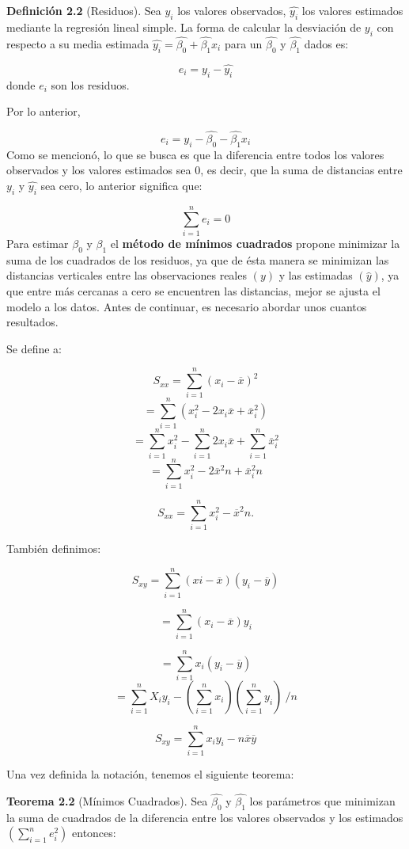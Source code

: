 \documentclass[
  a4paper,
  oneside,
  openany]{book}
\begin{document}
\textbf{Definición 2.2} (Residuos). Sea \(y_{i}\) los valores observados, \(\hat{y_{i}}\) los valores estimados mediante la regresión lineal simple. La forma de calcular la desviación de \(y_{i}\) con respecto a su media estimada \(\hat{y_{i}}=\hat{\beta_{0}}+\hat{\beta_{1}}x_{i}\) para un \(\hat{\beta_{0}}\) y \(\hat{\beta_{1}}\) dados es:

\[e_{i}=y_{i}-\hat{y_{i}}\]
donde \(e_{i}\) son los residuos.

Por lo anterior,

\[e_{i}=y_{i}-\hat{\beta_{0}}-\hat{\beta_{1}}x_{i}\]
Como se mencionó, lo que se busca es que la diferencia entre todos los valores observados y los valores estimados sea 0, es decir, que la suma de distancias entre \(y_{i}\) y \(\hat{y_{i}}\) sea cero, lo anterior significa que:

\[\sum_{i=1}^{n}e_{i}=0\]
Para estimar \(\beta_{0}\) y \(\beta_{1}\) el \textbf{método de mínimos cuadrados} propone minimizar la suma de los cuadrados de los residuos, ya que de ésta manera se minimizan las distancias verticales entre las observaciones reales \((y)\) y las estimadas \((\hat{y})\), ya que entre más cercanas a cero se encuentren las distancias, mejor se ajusta el modelo a los datos.
Antes de continuar, es necesario abordar unos cuantos resultados.

Se define a:

\[S_{xx}=\sum_{i=1}^{n}(x_{i}-\overline{x})^{2}\]
\[=\sum_{i=1}^{n}(x_{i}^2-2x_{i}\overline{x}+\overline{x}_{i}^{2})\]
\[=\sum_{i=1}^{n}x_{i}^{2}-\sum_{i=1}^{n}2x_{i}\overline{x}+\sum_{i=1}^{n}\overline{x}_{i}^2\]
\[=\sum_{i=1}^{n}x_{i}^2-2\overline{x}^2n+\overline{x}_{i}^2n\]

\[S_{xx}=\sum_{i=1}^{n}x_{i}^2-\overline{x}^2n.\]

También definimos:

\[S_{xy}=\sum_{i=1}^{n}(xi-\overline{x})(y_{i}-\overline{y})\]

\[=\sum_{i=1}^{n}(x_{i}-\overline{x})y_{i}\]

\[=\sum_{i=1}^{n}x_{i}(y_{i}-\overline{y})\]
\[=\sum_{i=1}^{n}X_{i}y_{i}-\left(\sum_{i=1}^{n}x_{i}\right) \left(\sum_{i=1}^{n}y_{i}\right) \ /{n}\]

\[S_{xy}=\sum_{i=1}^{n}x_{i}y_{i}-n\overline{x}\overline{y}\]

Una vez definida la notación, tenemos el siguiente teorema:

\textbf{Teorema 2.2} (Mínimos Cuadrados). Sea \(\hat{\beta_0}\) y \(\hat{\beta_{1}}\) los parámetros que minimizan la suma de cuadrados de la diferencia entre los valores observados y los estimados \(\left(\sum_{i=1}^{n}e_i^2\right)\) entonces:
\end{document}
